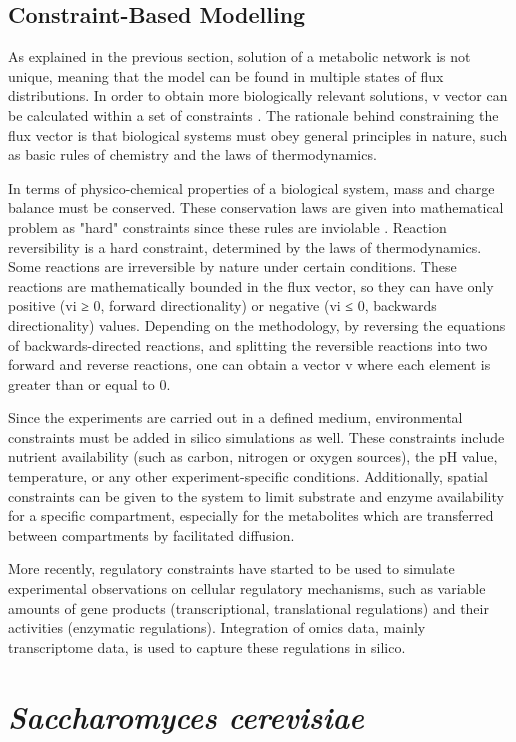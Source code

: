 \subsection{Constraint-Based Modelling}
As explained in the previous section, solution of a metabolic network is not unique, meaning that the model can be found in multiple states of flux distributions. In order to obtain more biologically relevant solutions, v vector can be calculated within a set of constraints \cite{thiele2007bringing}. The rationale behind constraining the flux vector is that biological systems must obey general principles in nature, such as basic rules of chemistry and the laws of thermodynamics.

In terms of physico-chemical properties of a biological system, mass and charge balance must be conserved. These conservation laws are given into mathematical problem as "hard" constraints since these rules are inviolable \cite{price2004genome}. Reaction reversibility is a hard constraint, determined by the laws of thermodynamics. Some reactions are irreversible by nature under certain conditions. These reactions are mathematically bounded in the flux vector, so they can have only positive (vi ≥ 0, forward directionality) or negative (vi ≤ 0, backwards directionality) values. Depending on the methodology, by reversing the equations of backwards-directed reactions, and splitting the reversible reactions into two forward and reverse reactions, one can obtain a vector v where each element is greater than or equal to 0. 

Since the experiments are carried out in a defined medium, environmental constraints must be added in silico simulations as well. These constraints include nutrient availability (such as carbon, nitrogen or oxygen sources), the pH value, temperature, or any other experiment-specific conditions. Additionally, spatial constraints can be given to the system to limit substrate and enzyme availability for a specific compartment, especially for the metabolites which are transferred between compartments by facilitated diffusion.

More recently, regulatory constraints have started to be used to simulate experimental observations on cellular regulatory mechanisms, such as variable amounts of gene products (transcriptional, translational regulations) and their activities (enzymatic regulations). Integration of omics data, mainly transcriptome data, is used to capture these regulations in silico.

\section{\emph{Saccharomyces cerevisiae}}

